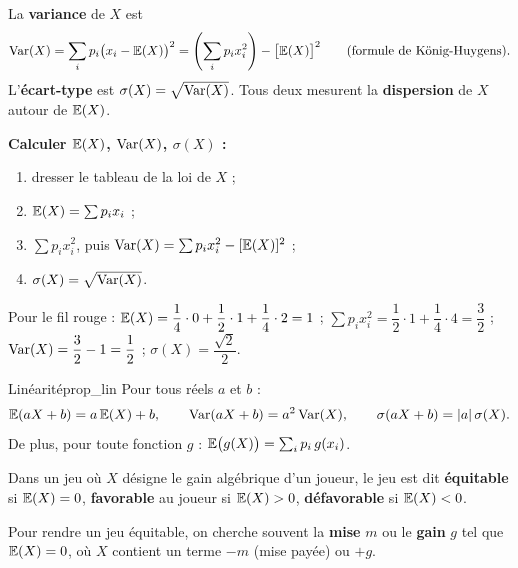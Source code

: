 \begin{definition}
	La \textbf{variance} de $X$ est
	\[
	\mathrm{Var}(X) = \sum_i p_i\bigl(x_i-\mathbb{E}(X)\bigr)^2
	= \left(\sum_i p_i x_i^2\right) - \bigl[\mathbb{E}(X)\bigr]^2
	\qquad\text{(formule de König-Huygens).}
	\]
	L'\textbf{écart-type} est $\sigma(X) = \sqrt{\mathrm{Var}(X)}$. Tous deux mesurent
	la \textbf{dispersion} de $X$ autour de $\mathbb{E}(X)$.
\end{definition}

\begin{methode}
	\textbf{Calculer $\mathbb{E}(X)$, $\mathrm{Var}(X)$, $\sigma(X)$ :}
	\begin{enumerate}
		\item dresser le tableau de la loi de $X$ ;
		\item $\mathbb{E}(X) = \sum p_i x_i$ ;
		\item $\sum p_i x_i^2$, puis $\mathrm{Var}(X) = \sum p_i x_i^2 - [\mathbb{E}(X)]^2$ ;
		\item $\sigma(X) = \sqrt{\mathrm{Var}(X)}$.
	\end{enumerate}
\end{methode}

\begin{exemple}
	Pour le fil rouge : $\mathbb{E}(X) = \dfrac14\cdot0 + \dfrac12\cdot1 +
	\dfrac14\cdot2 = 1$ ;
	$\sum p_i x_i^2 = \dfrac12\cdot1 + \dfrac14\cdot4 = \dfrac32$ ;
	$\mathrm{Var}(X) = \dfrac32 - 1 = \dfrac12$ ; $\sigma(X) = \dfrac{\sqrt2}{2}$.
\end{exemple}

\begin{propriete}{Linéarité}{prop_lin}
	Pour tous réels $a$ et $b$ :
	\[
	\mathbb{E}(aX+b) = a\,\mathbb{E}(X)+b, \qquad
	\mathrm{Var}(aX+b) = a^2\,\mathrm{Var}(X), \qquad
	\sigma(aX+b) = |a|\,\sigma(X).
	\]
	De plus, pour toute fonction $g$ :
	$\mathbb{E}\bigl(g(X)\bigr)=\sum_i p_i\,g(x_i)$.
\end{propriete}

\begin{definition}
	Dans un jeu où $X$ désigne le gain algébrique d'un joueur, le jeu est dit
	\textbf{équitable} si $\mathbb{E}(X)=0$, \textbf{favorable} au joueur si
	$\mathbb{E}(X)>0$, \textbf{défavorable} si $\mathbb{E}(X)<0$.
\end{definition}

\begin{astucebac}
	Pour rendre un jeu équitable, on cherche souvent la \textbf{mise} $m$ ou
	le \textbf{gain} $g$ tel que $\mathbb{E}(X)=0$, où $X$ contient un terme
	$-m$ (mise payée) ou $+g$.
\end{astucebac}


